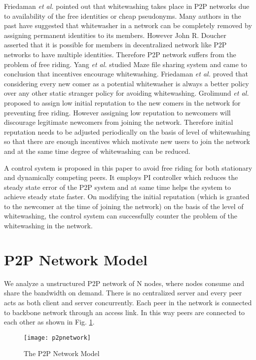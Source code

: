 \documentclass[journal]{IEEEtran}
\begin{document}
Friedaman \emph{et al.} \cite{Friedman} pointed out that whitewashing takes place in P2P networks due to availability of the free identities or cheap pseudonyms. Many authors \cite{Castro}\cite{Izhak-Ratzin} in the past have suggested that whitewasher in a network can be completely removed by assigning permanent identities to its members. However John R. Doucher \cite{Sybil_Attack} asserted  that it is possible for members in decentralized network like P2P networks to have multiple identities. Therefore P2P network suffers from the problem of free riding. Yang \emph{et al.} \cite{Yang_Whitewashing} studied Maze file sharing system and came to conclusion that incentives encourage whitewashing. Friedaman \emph{et al.} \cite{Friedman} proved that considering every new comer as a potential whitewasher is always a better policy over any other static stranger policy for avoiding whitewashing. Grolimund \emph{et al.} \cite{Grolimund} proposed to assign low initial reputation to the new comers in the network for preventing free riding. However assigning low reputation to newcomers will discourage legitimate newcomers from joining the network. Therefore initial reputation needs to be adjusted periodically on the basis of level of whitewashing so that there are enough incentives which motivate new users to join the network and at the same time degree of whitewashing can be reduced.

A control system is proposed in this paper to avoid free riding for both stationary and dynamically competing peers. It employs PI controller \cite{Ogata} which reduces the steady state error of the P2P system and at same time helps the system to achieve steady state faster. On modifying the initial reputation (which is granted to the newcomer at the time of joining the network) on the basis of the level of whitewashing, the control system can successfully counter the problem of the whitewashing in the network.

\section{P2P Network Model}
\label{nwk_model}
We analyze a unstructured P2P network of N nodes, where nodes consume and share the bandwidth on demand. There is no centralized server and every peer acts as both client and server concurrently. Each peer in the network is connected to backbone network through an access link. In this way peers are connected to each other as shown in Fig. \ref{p2pnetwork}.
\begin{figure}
	\centering
	\texttt{[image: p2pnetwork]}
	\caption{The P2P Network Model}
	\label{p2pnetwork}
\end{figure}  
\end{document}

